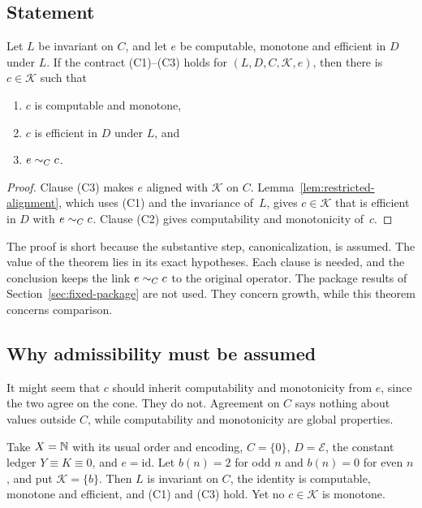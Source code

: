 \subsection{Statement}

\begin{theorem}\label{thm:conditional-arithmetic-lift}
Let $L$ be invariant on $C$, and let $e$ be computable, monotone and efficient in $D$ under $L$. If the contract \textup{(C1)--(C3)} holds for $(L,D,C,\mathcal{K},e)$, then there is $c\in\mathcal{K}$ such that
\begin{enumerate}
\item $c$ is computable and monotone,
\item $c$ is efficient in $D$ under $L$, and
\item $e\mathrel{\sim_{C}}c$.
\end{enumerate}
\end{theorem}

\begin{proof}
Clause (C3) makes $e$ aligned with $\mathcal{K}$ on $C$. Lemma~\ref{lem:restricted-alignment}, which uses (C1) and the invariance of~$L$, gives $c\in\mathcal{K}$ that is efficient in $D$ with $e\mathrel{\sim_{C}}c$. Clause (C2) gives computability and monotonicity of~$c$.
\end{proof}

The proof is short because the substantive step, canonicalization, is assumed. The value of the theorem lies in its exact hypotheses. Each clause is needed, and the conclusion keeps the link $e\mathrel{\sim_{C}}c$ to the original operator. The package results of Section~\ref{sec:fixed-package} are not used. They concern growth, while this theorem concerns comparison.

\subsection{Why admissibility must be assumed}

It might seem that $c$ should inherit computability and monotonicity from $e$, since the two agree on the cone. They do not. Agreement on $C$ says nothing about values outside $C$, while computability and monotonicity are global properties.

\begin{proposition}\label{prop:admissibility-necessary}
Take $X=\mathbb{N}$ with its usual order and encoding, $C=\{0\}$, $D=\mathcal{E}$, the constant ledger $Y\equiv K\equiv 0$, and $e=\mathrm{id}$. Let $b(n)=2$ for odd $n$ and $b(n)=0$ for even $n$, and put $\mathcal{K}=\{b\}$. Then $L$ is invariant on $C$, the identity is computable, monotone and efficient, and (C1) and (C3) hold. Yet no $c\in\mathcal{K}$ is monotone.
\end{proposition}

